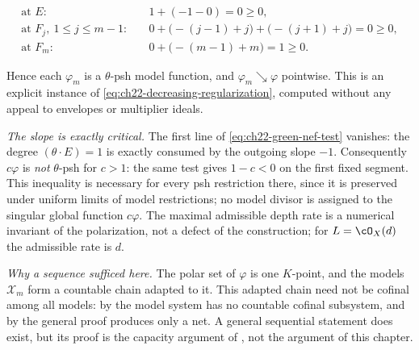 \begin{example}
\[
 \begin{aligned}
 \text{at }E:&\quad 1+(-1-0)=0\geq0,\\
 \text{at }F_j,\ 1\leq j\leq m-1:&\quad
   0+\bigl(-(j-1)+j\bigr)+\bigl(-(j+1)+j\bigr)=0\geq0,\\
 \text{at }F_m:&\quad 0+\bigl(-(m-1)+m\bigr)=1\geq0 .
 \end{aligned}
\tag{22.86}\label{eq:ch22-green-nef-test}
\]

Hence each $\varphi_m$ is a $\theta$-psh model function, and
$\varphi_m\searrow\varphi$ pointwise.  This is an explicit instance of
\eqref{eq:ch22-decreasing-regularization}, computed without any appeal to
envelopes or multiplier ideals.

\emph{The slope is exactly critical.}  The first line of
\eqref{eq:ch22-green-nef-test} vanishes: the degree $(\theta\cdot E)=1$ is
exactly consumed by the outgoing slope $-1$.  Consequently
$c\varphi$ is \emph{not} $\theta$-psh for $c>1$: the same test gives
$1-c<0$ on the first fixed segment.  This inequality is necessary for
every psh restriction there, since it is preserved under uniform limits of
model restrictions; no model divisor is assigned to the singular global
function $c\varphi$.  The maximal admissible depth rate is a numerical
invariant of
the polarization, not a defect of the construction; for
$L=\cO_X(d)$ the admissible rate is $d$.

\emph{Why a sequence sufficed here.}  The polar set of $\varphi$ is one
$K$-point, and the models $\mathcal X_m$ form a countable chain adapted
to it.  This adapted chain need not be cofinal among all models: by
 the model system has no countable
cofinal subsystem, and by  the general
proof produces only a net.  A general sequential statement does exist, but
its proof is the capacity argument of
, not the argument of this chapter.
\end{example}

